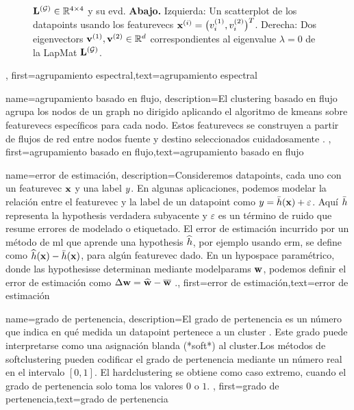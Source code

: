 {{{{\begin{figure}[H]
\begin{center}
{					${\bf L}^{(\mathcal{G})}  \in \mathbb{R}^{4 \times 4}$ y su \gls{evd}. 
					{\bf Abajo.} Izquierda: Un \gls{scatterplot} de los \gls{datapoint}s usando los \gls{featurevec}s 
					${\bf x}^{(i)} = \big( v^{(1)}_{i},v^{(2)}_{i} \big)^{T}$. 
					Derecha: Dos \gls{eigenvector}s ${\bf v}^{(1)},{\bf v}^{(2)} \in \mathbb{R}^{d}$ 
					correspondientes al \gls{eigenvalue} $\lambda=0$ de la \gls{LapMat} ${\bf L}^{(\mathcal{G})}$. 
					} 
			\end{center}
		\end{figure}
	\newpage}, 
	first={agrupamiento espectral},text={agrupamiento espectral} 
}

{name={agrupamiento basado en flujo},
	description={El \gls{clustering} basado en flujo agrupa los nodos de un 
		\gls{graph} no dirigido aplicando el algoritmo de \gls{kmeans} sobre
		\gls{featurevec}s específicos para cada nodo. Estos \gls{featurevec}s se construyen a partir de flujos de red entre nodos 
		fuente y destino seleccionados cuidadosamente \cite{FlowSpecClustering2021}. }, 
	first={agrupamiento basado en flujo},text={agrupamiento basado en flujo} 
}



{name={error de estimación},
	description={Consideremos \gls{datapoint}s, cada uno con un \gls{featurevec} ${\bf x}$ y una \gls{label} 
		$y$. En algunas aplicaciones, podemos modelar la relación entre el \gls{featurevec} y la \gls{label}
		de un \gls{datapoint} como $y = \bar{h}({\bf x}) + \varepsilon$. Aquí $\bar{h}$ 
		representa la \gls{hypothesis} verdadera subyacente y $\varepsilon$ es un término de ruido que resume errores de modelado o etiquetado.
		El error de estimación incurrido por un método de \gls{ml} que aprende una \gls{hypothesis} $\widehat{h}$, por ejemplo usando \gls{erm}, se define como 
		$\widehat{h}({\bf x}) - \bar{h}({\bf x})$, para algún \gls{featurevec} dado. 
		En un \gls{hypospace} paramétrico, donde las \gls{hypothesis}se determinan mediante
		\gls{modelparams} ${\bf w}$, podemos definir el error de estimación como  $\Delta {\bf w} = \widehat{{\bf w}} - \overline{{\bf w}}$ \cite{kay,hastie01statisticallearning}.},
	first={error de estimación},text={error de estimación} 
}


{name={grado de pertenencia},
	description={El grado de pertenencia es un número que indica en qué medida un \gls{datapoint} 
		pertenece a un \gls{cluster} \cite[Ch. 8]{MLBasics}. Este grado puede interpretarse 
		como una asignación blanda (*soft*) al \gls{cluster}.Los métodos de \Gls{softclustering} 
		pueden codificar el grado de pertenencia mediante un número real en el intervalo $[0,1]$. 
		El \Gls{hardclustering} se obtiene como caso extremo, cuando el grado de pertenencia solo toma los valores $0$ o $1$.
		}, 
		first={grado de pertenencia},text={grado de pertenencia} 
}

}}

